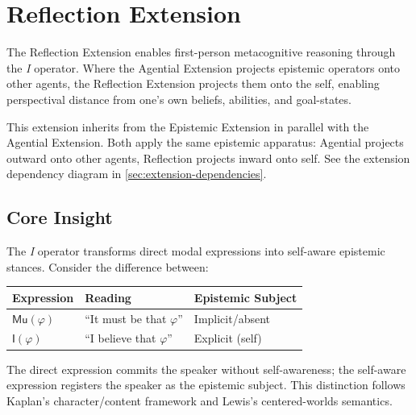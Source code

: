 \documentclass[../LogosReference.tex]{subfiles}
\begin{document}

\section{Reflection Extension}\label{sec:reflection}

The Reflection Extension enables first-person metacognitive reasoning through the \emph{I} operator.
Where the Agential Extension projects epistemic operators onto other agents, the Reflection Extension projects them onto the self, enabling perspectival distance from one's own beliefs, abilities, and goal-states.

\begin{remark}[Dependency]
This extension inherits from the Epistemic Extension in parallel with the Agential Extension.
Both apply the same epistemic apparatus: Agential projects outward onto other agents, Reflection projects inward onto self.
See the extension dependency diagram in \cref{sec:extension-dependencies}.
\end{remark}


\subsection{Core Insight}\label{sec:reflection-insight}

The \emph{I} operator transforms direct modal expressions into self-aware epistemic stances.
Consider the difference between:

\begin{center}
\begin{tabular}{lll}
\toprule
\textbf{Expression} & \textbf{Reading} & \textbf{Epistemic Subject} \\
\midrule
$\mathsf{Mu}(\varphi)$ & ``It must be that $\varphi$'' & Implicit/absent \\
$\mathsf{I}(\varphi)$ & ``I believe that $\varphi$'' & Explicit (self) \\
\bottomrule
\end{tabular}
\end{center}

The direct expression commits the speaker without self-awareness; the self-aware expression registers the speaker as the epistemic subject.
This distinction follows Kaplan's character/content framework and Lewis's centered-worlds semantics.
\end{document}
